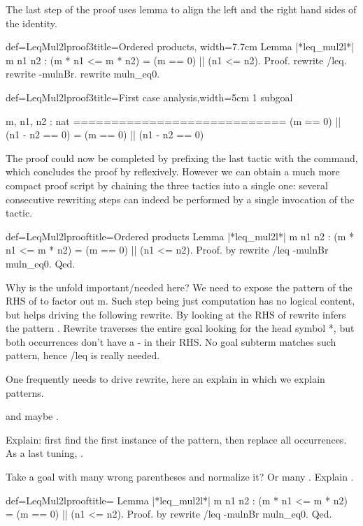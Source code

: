 The last step of the proof uses lemma  to align the left
and the right hand sides of the identity.

\begin{coq}{def=LeqMul2lproof3}{title=Ordered products, width=7.7cm}
Lemma |*leq_mul2l*| m n1 n2 :
(m * n1 <= m * n2) = (m == 0) || (n1 <= n2).
Proof.
rewrite /leq.
rewrite -mulnBr.
rewrite muln_eq0.
\end{coq}
\begin{coqout}{def=LeqMul2lproof3}{title=First case analysis,width=5cm}
1 subgoal

m, n1, n2 : nat
============================
(m == 0) || (n1 - n2 == 0) =
(m == 0) || (n1 - n2 == 0)
\end{coqout}

The proof could now be completed by prefixing the last tactic with the
 command, which concludes the proof by reflexively. However we
can obtain a much more compact proof script by chaining the three
tactics into a single one: several consecutive rewriting steps can
indeed be performed by a single invocation of the  tactic.

\begin{coq}{def=LeqMul2lproof}{title=Ordered products}
Lemma |*leq_mul2l*| m n1 n2 : (m * n1 <= m * n2) = (m == 0) || (n1 <= n2).
Proof. by rewrite /leq -mulnBr muln_eq0. Qed.
\end{coq}

Why is the unfold important/needed here?  We need to expose the pattern of the
RHS of  to factor out m.  Such step being just computation has no
logical content, but helps driving the following rewrite.
By looking at the RHS of  rewrite infers the pattern
\C{(_ * (_ - _))}.  Rewrite traverses the entire goal looking for the
head symbol *, but both occurrences don't have a - in their RHS.
No goal subterm matches such pattern, hence /leq is really needed.

One frequently needs to drive rewrite, here an explain in which we explain
patterns.

 and maybe .

Explain: first find the first instance of the pattern, then replace all
occurrences.  As a last tuning, .

Take a goal with many wrong parentheses and normalize it? Or many .
Explain \C{!}.

\begin{coq}{def=LeqMul2lproof}{title=}
Lemma |*leq_mul2l*| m n1 n2 : (m * n1 <= m * n2) = (m == 0) || (n1 <= n2).
Proof. by rewrite /leq -mulnBr muln_eq0. Qed.
\end{coq}



